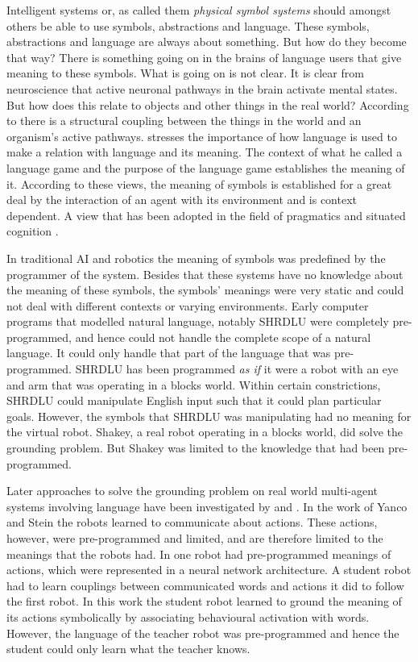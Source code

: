 Intelligent systems or, as \citet{newell:1980} called them {\em physical symbol systems} should amongst others be able to use symbols, abstractions and language. These symbols, abstractions and language are always about something. But how do they become that way? There is something going on in the brains of language users that give meaning to these symbols. What is going on is not clear. It is clear from neuroscience that active neuronal pathways in the brain activate mental states. But how does this relate to objects and other things in the real world? According to \citet{maturanavarela:1992} there is a structural coupling between the things in the world and an organism's active pathways. \citet{wittgenstein:1958} stresses the importance of how language is used to make a relation with language and its meaning. The context of what he called a language game and the purpose of the language game establishes the meaning of it. According to these views, the meaning of symbols is established for a great deal by the interaction of an agent with its environment and is context dependent. A view that has been adopted in the field of pragmatics and situated cognition \citep{clancey:1997}.

In traditional AI and robotics the meaning of symbols was predefined by the programmer of the system. Besides that these systems have no knowledge about the meaning of these symbols, the symbols' meanings were very static and could not deal with different contexts or varying environments. Early computer programs that modelled natural language, notably SHRDLU \citep{winograd:1972} were completely pre-programmed, and hence could not handle the complete scope of a natural language. It could only handle that part of the language that was pre-programmed. SHRDLU has been programmed {\em as if} it were a robot with an eye and arm that was operating in a blocks world. Within certain constrictions, SHRDLU could manipulate English input such that it could plan particular goals. However, the symbols that SHRDLU was manipulating had no meaning for the virtual robot. Shakey, a real robot operating in a blocks world, did solve the grounding problem. But Shakey was limited to the knowledge that had been pre-programmed.

Later approaches to solve the grounding problem on real world multi-agent systems involving language have been investigated by \citet{yancostein} and \citet{billard:1997a}. In the work of Yanco and Stein the robots learned to communicate about actions. These actions, however, were pre-programmed and limited, and are therefore limited to the meanings that the robots had. In \citet{billard:1997a} one robot had pre-programmed meanings of actions, which were represented in a neural network architecture. A student robot had to learn couplings between communicated words and actions it did to follow the first robot. In this work the student robot learned to ground the meaning of its actions symbolically by associating behavioural activation with words. However, the language of the teacher robot was pre-programmed and hence the student could only learn what the teacher knows.


